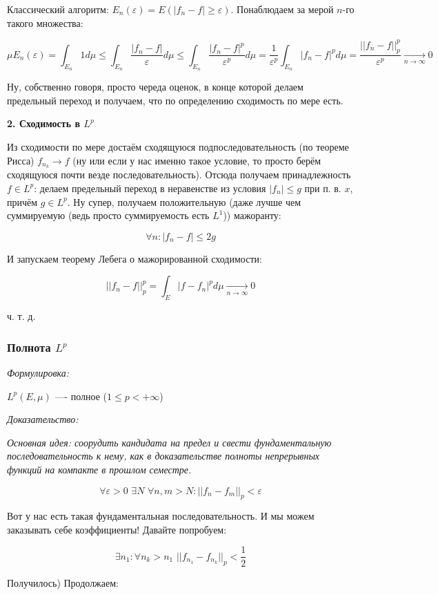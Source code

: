 \documentclass{article}
\def\dbl{\,\,}
\def\goesto#1{\underset{#1}{\longrightarrow}}
\def\toinf#1{\goesto{#1 \rightarrow \infty}}
\def\ntoinf{\toinf{n}}
\begin{document}
Классический алгоритм: $E_n(\varepsilon) = E(|f_n - f| \ge \varepsilon)$. Понаблюдаем за мерой $n$-го такого множества:

\[\mu E_n(\varepsilon) = \int_{E_n} 1 d\mu \le \int_{E_n} \frac{|f_n - f|}{\varepsilon} d\mu \le \int_{E_n} \frac{|f_n - f|^p}{\varepsilon^p} d\mu = \frac{1}{\varepsilon^p} \int_{E_n} |f_n - f|^p d\mu = \frac{||f_n - f||_p^p}{\varepsilon^p} \ntoinf 0\]

Ну, собственно говоря, просто череда оценок, в конце которой делаем предельный переход и получаем, что по определению сходимость по мере есть.

\textbf{2. Сходимость в $L^p$}

Из сходимости по мере достаём сходящуюся подпоследовательность (по теореме Рисса) $f_{n_k} \rightarrow f$ (ну или если у нас именно такое условие, то просто берём сходящуюся почти везде последовательность). Отсюда получаем принадлежность $f \in L^p$: делаем предельный переход в неравенстве из условия $|f_n| \le g$ при п. в. $x$, причём $g \in L^p$. Ну супер, получаем положительную (даже лучше чем суммируемую (ведь просто суммируемость есть $L^1$)) мажоранту:

\[\forall n: |f_n - f| \le 2g\]

И запускаем теорему Лебега о мажорированной сходимости:

\[||f_n - f||_p^p = \int_{E} |f - f_n|^p d\mu \ntoinf 0 \]

ч. т. д. 

\subsubsection{Полнота $L^p$}
\textit{Формулировка:}

$L^p(E, \mu)$ ---- полное ($1 \le p < + \infty$)

\textit{Доказательство:}

\textit{Основная идея: соорудить кандидата на предел и свести фундаментальную последовательность к нему, как в доказательстве полноты непрерывных функций на компакте в прошлом семестре.}

\[\forall \varepsilon > 0 \dbl \exists N \dbl \forall n, m > N: ||f_n - f_m||_p < \varepsilon\]

Вот у нас есть такая фундаментальная последовательность. И мы можем заказывать себе коэффициенты! Давайте попробуем:

\[\exists n_1: \forall n_k > n_1 \dbl ||f_{n_1} - f_{n_k}||_p < \frac{1}{2}\]

Получилось) Продолжаем:
\end{document}
